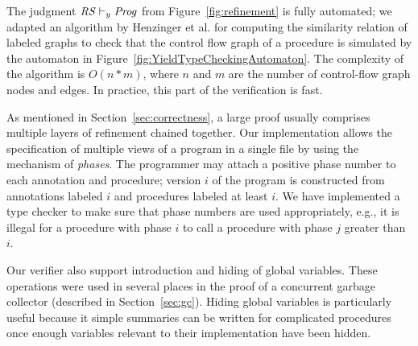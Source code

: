 The judgment $\mathit{RS} \vdash_y \mathit{Prog}$ from Figure~\ref{fig:refinement} is fully automated;
we adapted an algorithm by Henzinger et al.\cite{HenzingerHK95} for computing the similarity relation of 
labeled graphs to check that the control flow graph of a procedure is simulated by
the automaton in Figure~\ref{fig:YieldTypeCheckingAutomaton}.
The complexity of the algorithm is $O(n*m)$, where $n$ and $m$ are the number of control-flow graph nodes and edges.
In practice, this part of the verification is fast.

As mentioned in Section~\ref{sec:correctness}, a large proof usually comprises multiple layers of refinement chained together.
Our implementation allows the specification of multiple views of a program in a single file by using the mechanism of {\em phases}.
The programmer may attach a positive phase number to each annotation and procedure; 
version $i$ of the program is constructed from annotations labeled $i$ and procedures labeled at least $i$.
We have implemented a type checker to make sure that phase numbers are used appropriately, e.g., 
it is illegal for a procedure with phase $i$ to call a procedure with phase $j$ greater than $i$.

Our verifier also support introduction and hiding of global variables.
These operations were used in several places in the proof of a concurrent garbage collector (described in Section~\ref{sec:gc}).
Hiding global variables is particularly useful because it simple summaries can be written for complicated procedures
once enough variables relevant to their implementation have been hidden.

